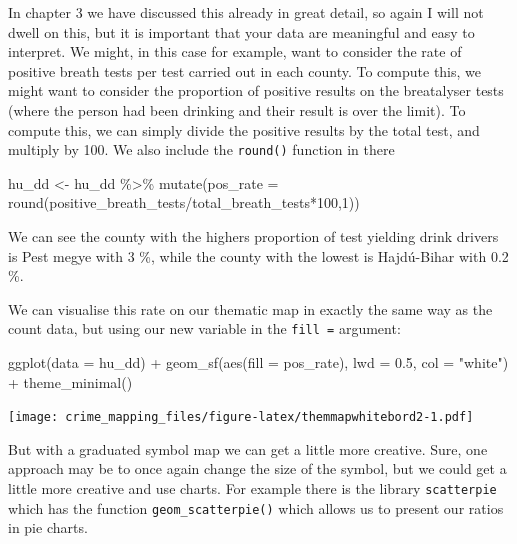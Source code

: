 \documentclass[
]{book}
\newenvironment{Shaded}{\begin{snugshade}}{\end{snugshade}}
\newcommand{\AttributeTok}[1]{\textcolor[rgb]{0.77,0.63,0.00}{#1}}
\newcommand{\DecValTok}[1]{\textcolor[rgb]{0.00,0.00,0.81}{#1}}
\newcommand{\FloatTok}[1]{\textcolor[rgb]{0.00,0.00,0.81}{#1}}
\newcommand{\FunctionTok}[1]{\textcolor[rgb]{0.00,0.00,0.00}{#1}}
\newcommand{\NormalTok}[1]{#1}
\newcommand{\OtherTok}[1]{\textcolor[rgb]{0.56,0.35,0.01}{#1}}
\newcommand{\SpecialCharTok}[1]{\textcolor[rgb]{0.00,0.00,0.00}{#1}}
\newcommand{\StringTok}[1]{\textcolor[rgb]{0.31,0.60,0.02}{#1}}
\begin{document}
In chapter 3 we have discussed this already in great detail, so again I will not dwell on this, but it is important that your data are meaningful and easy to interpret. We might, in this case for example, want to consider the rate of positive breath tests per test carried out in each county. To compute this, we might want to consider the proportion of positive results on the breatalyser tests (where the person had been drinking and their result is over the limit). To compute this, we can simply divide the positive results by the total test, and multiply by 100. We also include the \texttt{round()} function in there

\begin{Shaded}
\begin{Highlighting}[]
\NormalTok{hu\_dd }\OtherTok{\textless{}{-}}\NormalTok{ hu\_dd }\SpecialCharTok{\%\textgreater{}\%} 
  \FunctionTok{mutate}\NormalTok{(}\AttributeTok{pos\_rate =} \FunctionTok{round}\NormalTok{(positive\_breath\_tests}\SpecialCharTok{/}\NormalTok{total\_breath\_tests}\SpecialCharTok{*}\DecValTok{100}\NormalTok{,}\DecValTok{1}\NormalTok{))}
\end{Highlighting}
\end{Shaded}

We can see the county with the highers proportion of test yielding drink drivers is Pest megye with 3 \%, while the county with the lowest is Hajdú-Bihar with 0.2 \%.

We can visualise this rate on our thematic map in exactly the same way as the count data, but using our new variable in the \texttt{fill\ =} argument:

\begin{Shaded}
\begin{Highlighting}[]
\FunctionTok{ggplot}\NormalTok{(}\AttributeTok{data =}\NormalTok{ hu\_dd) }\SpecialCharTok{+} 
  \FunctionTok{geom\_sf}\NormalTok{(}\FunctionTok{aes}\NormalTok{(}\AttributeTok{fill =}\NormalTok{ pos\_rate), }\AttributeTok{lwd =} \FloatTok{0.5}\NormalTok{, }\AttributeTok{col =} \StringTok{"white"}\NormalTok{) }\SpecialCharTok{+} 
  \FunctionTok{theme\_minimal}\NormalTok{()}
\end{Highlighting}
\end{Shaded}

\texttt{[image: crime\_mapping\_files/figure-latex/themmapwhitebord2-1.pdf]}

But with a graduated symbol map we can get a little more creative. Sure, one approach may be to once again change the size of the symbol, but we could get a little more creative and use charts. For example there is the library \texttt{scatterpie} which has the function \texttt{geom\_scatterpie()} which allows us to present our ratios in pie charts.
\end{document}
